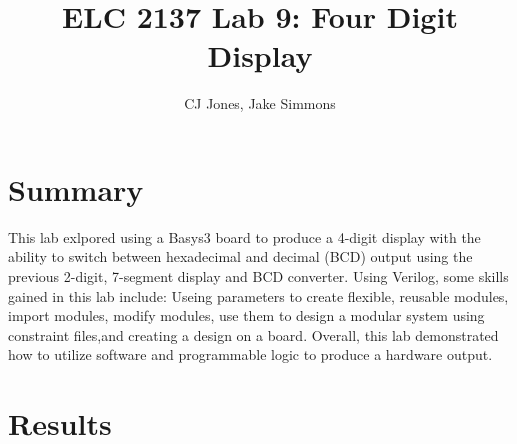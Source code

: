 \documentclass[11pt]{article}
\begin{document}
\title{ELC 2137 Lab 9: Four Digit Display}
\author{CJ Jones, Jake Simmons}

\maketitle


\section*{Summary}

This lab exlpored using a Basys3 board to produce a 4-digit display with the ability to switch between hexadecimal and decimal (BCD) output using the previous 2-digit, 7-segment display and BCD converter. Using Verilog, some skills gained in this lab include:  Useing parameters to create ﬂexible, reusable modules, import modules, modify modules, use them to design a modular system using constraint files,and creating a design on a board. Overall, this lab demonstrated how to utilize software and programmable logic to produce a hardware output.













\section*{Results}
\end{document}
